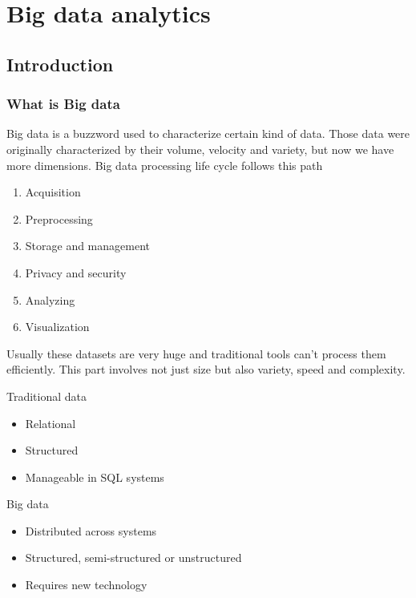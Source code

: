 \section{Big data analytics}



\subsection{Introduction}

\subsubsection{What is Big data}

Big data is a buzzword used to characterize certain kind of data. Those data were originally characterized by their volume, velocity and variety, but now we have more dimensions. Big data processing life cycle follows this path

\begin{enumerate}
    \item Acquisition
    \item Preprocessing
    \item Storage and management
    \item Privacy and security
    \item Analyzing
    \item Visualization
\end{enumerate}

Usually these datasets are very huge and traditional tools can't process them efficiently. This part involves not just size but also variety, speed and complexity.

\vspace{10pt}

Traditional data 

\begin{itemize}
    \item Relational
    \item Structured
    \item Manageable in SQL systems
\end{itemize}

Big data
\begin{itemize}
    \item Distributed across systems
    \item Structured, semi-structured or unstructured
    \item Requires new technology
\end{itemize}

